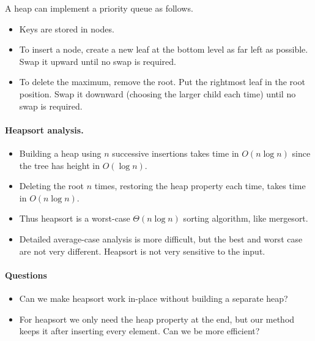 A heap can implement a priority queue as follows. 
\begin{itemize}
\item Keys are stored in nodes. 
\item To insert a node, create a new leaf at the bottom level as far left as 
possible. Swap it upward until no swap is required. 
\item To delete the maximum, remove the root. Put the rightmost leaf in the root
 position. Swap it downward (choosing the larger child each time) until no swap 
is required. 
\end{itemize}

\paragraph{Heapsort analysis.}
\begin{itemize}
\item Building a heap using $n$ successive insertions takes time in 
$O(n\log n)$ since the tree has height in $O(\log n)$.
\item Deleting the root $n$ times, restoring the heap property each time, takes
 time in $O(n \log n)$.
\item Thus heapsort is a worst-case $\Theta(n \log n)$ sorting algorithm, like 
mergesort. 
\item Detailed average-case analysis is more difficult, but the best and worst 
case are not very different. Heapsort is not very sensitive to the input.
\end{itemize}

\paragraph{Questions}
\begin{itemize}
\item Can we make heapsort work in-place without building a separate heap?
\item For heapsort we only need the heap property at the end, but our method keeps it after inserting every element. 
Can we be more efficient?
\end{itemize}


